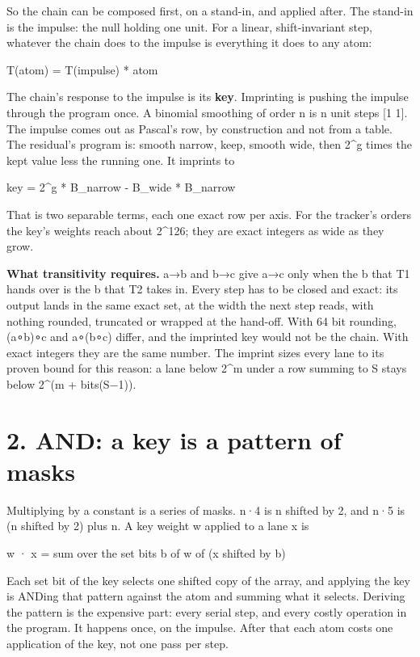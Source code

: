 So the chain can be composed first, on a stand-in, and applied after. The stand-in is the impulse: the null holding one unit. For a linear, shift-invariant step, whatever the chain does to the impulse is everything it does to any atom:

T(atom) = T(impulse) * atom

The chain's response to the impulse is its \textbf{key}. Imprinting is pushing the impulse through the program once. A binomial smoothing of order n is n unit steps [1 1]. The impulse comes out as Pascal's row, by construction and not from a table. The residual's program is: smooth narrow, keep, smooth wide, then 2\textasciicircum{}g times the kept value less the running one. It imprints to

key = 2\textasciicircum{}g * B\_\allowbreak{}narrow  -  B\_\allowbreak{}wide * B\_\allowbreak{}narrow

That is two separable terms, each one exact row per axis. For the tracker's orders the key's weights reach about 2\textasciicircum{}126; they are exact integers as wide as they grow.

\textbf{What transitivity requires.} a→b and b→c give a→c only when the b that T1 hands over is the b that T2 takes in. Every step has to be closed and exact: its output lands in the same exact set, at the width the next step reads, with nothing rounded, truncated or wrapped at the hand-off. With 64 bit rounding, (a∘b)∘c and a∘(b∘c) differ, and the imprinted key would not be the chain. With exact integers they are the same number. The imprint sizes every lane to its proven bound for this reason: a lane below 2\textasciicircum{}m under a row summing to S stays below 2\textasciicircum{}(m + bits(S−1)).

\section{\texorpdfstring{2. AND: a key is a pattern of masks}{2. AND: a key is a pattern of masks}}

Multiplying by a constant is a series of masks. n·4 is n shifted by 2, and n·5 is (n shifted by 2) plus n. A key weight w applied to a lane x is

w · x = sum over the set bits b of w of (x shifted by b)

Each set bit of the key selects one shifted copy of the array, and applying the key is ANDing that pattern against the atom and summing what it selects. Deriving the pattern is the expensive part: every serial step, and every costly operation in the program. It happens once, on the impulse. After that each atom costs one application of the key, not one pass per step.

